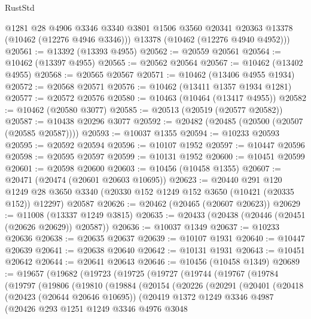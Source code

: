 \begin{lexlean}{RustStd}
\begin{coremodule}
        @1281
        @28
        @4906
        @3346
        @3340
        @3801
        @1506
        @3560
        @20341
        @20363
        @13378
        (@10462 (@12276 @4946 @3346)))
      @13378
      (@10462 (@12276 @4940 @4952)))
@20561 := @13392 (@13393 @4955)
@20562 := @20559 @20561
@20564 := @10462 (@13397 @4955)
@20565 := @20562 @20564
@20567 := @10462 (@13402 @4955)
@20568 := @20565 @20567
@20571 := @10462 (@13406 @4955 @1934)
@20572 := @20568 @20571
@20576 := @10462 (@13411 @1357 @1934 @1281)
@20577 := @20572 @20576
@20580 := @10463 (@10464 (@13417 @4955))
@20582 := @10462 (@20580 @3077)
@20585 := @20513 (@20519 (@20577 @20582))
@20587 := @10438 @20296 @3077
@20592 := @20482 (@20485 (@20500 (@20507 (@20585 @20587))))
@20593 := @10037 @1355
@20594 := @10233 @20593
@20595 := @20592 @20594
@20596 := @10107 @1952
@20597 := @10447 @20596
@20598 := @20595 @20597
@20599 := @10131 @1952
@20600 := @10451 @20599
@20601 := @20598 @20600
@20603 := @10456 (@10458 @1355)
@20607 := @20471 (@20474 (@20601 @20603 @10695))
@20623 := @20440
    @291
    @120
    @1249
    @28
    @3650
    @3340
    (@20330 @152 @1249 @152 @3650 (@10421 (@20335 @152)) @12297)
    @20587
@20626 := @20462 (@20465 (@20607 @20623))
@20629 := @11008 (@13337 @1249 @3815)
@20635 := @20433 (@20438 (@20446 (@20451 (@20626 @20629)) @20587))
@20636 := @10037 @1349
@20637 := @10233 @20636
@20638 := @20635 @20637
@20639 := @10107 @1931
@20640 := @10447 @20639
@20641 := @20638 @20640
@20642 := @10131 @1931
@20643 := @10451 @20642
@20644 := @20641 @20643
@20646 := @10456 (@10458 @1349)
@20689 := @19657
    (@19682
      (@19723
        (@19725
          (@19727
            (@19744
              (@19767
                (@19784
                  (@19797
                    (@19806
                      (@19810
                        (@19884
                          (@20154
                            (@20226
                              (@20291
                                (@20401
                                  (@20418
                                    (@20423 (@20644 @20646 @10695))
                                    (@20419
                                      @1372
                                      @1249
                                      @3346
                                      @4987
                                      (@20426
                                        @293
                                        @1251
                                        @1249
                                        @3346
                                        @4976
                                        @3048

\end{coremodule}
\end{lexlean}
